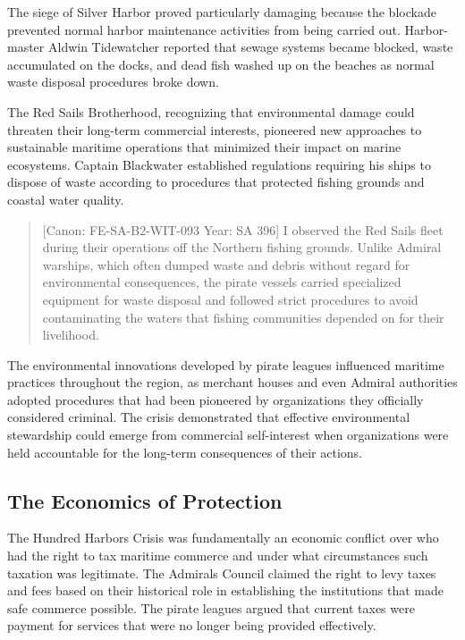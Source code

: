 The siege of Silver Harbor proved particularly damaging because the
blockade prevented normal harbor maintenance activities from being
carried out. Harbor-master Aldwin Tidewatcher reported that sewage
systems became blocked, waste accumulated on the docks, and dead fish
washed up on the beaches as normal waste disposal procedures broke down.

The Red Sails Brotherhood, recognizing that environmental damage could
threaten their long-term commercial interests, pioneered new approaches
to sustainable maritime operations that minimized their impact on marine
ecosystems. Captain Blackwater established regulations requiring his
ships to dispose of waste according to procedures that protected fishing
grounds and coastal water quality.

\begin{quote}
{[}Canon: FE-SA-B2-WIT-093 \textbar{} Year: SA 396{]} I observed the Red
Sails fleet during their operations off the Northern fishing grounds.
Unlike Admiral warships, which often dumped waste and debris without
regard for environmental consequences, the pirate vessels carried
specialized equipment for waste disposal and followed strict procedures
to avoid contaminating the waters that fishing communities depended on
for their livelihood.
\end{quote}

The environmental innovations developed by pirate leagues influenced
maritime practices throughout the region, as merchant houses and even
Admiral authorities adopted procedures that had been pioneered by
organizations they officially considered criminal. The crisis
demonstrated that effective environmental stewardship could emerge from
commercial self-interest when organizations were held accountable for
the long-term consequences of their actions.

\subsection{The Economics of
Protection}\label{the-economics-of-protection}

The Hundred Harbors Crisis was fundamentally an economic conflict over
who had the right to tax maritime commerce and under what circumstances
such taxation was legitimate. The Admiral\textquotesingle s Council
claimed the right to levy taxes and fees based on their historical role
in establishing the institutions that made safe commerce possible. The
pirate leagues argued that current taxes were payment for services that
were no longer being provided effectively.

